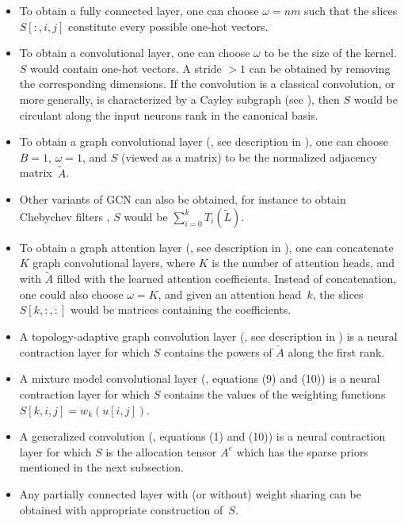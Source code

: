 \begin{itemize}%
\item[\ding{227}] To obtain a fully connected layer, one can choose $\omega = nm$ such that the slices $S[:,i,j]$ constitute every possible one-hot vectors.
\item[\ding{227}] To obtain a convolutional layer, one can choose $\omega$ to be the size of the kernel. $S$ would contain one-hot vectors. A stride $> 1$ can be obtained by removing the corresponding dimensions. If the convolution is a classical convolution, or more generally, is characterized by a Cayley subgraph (see ), then $S$ would be circulant along the input neurons rank in the canonical basis.
\item[\ding{227}] To obtain a graph convolutional layer (\cite{kipf2016semi}, see description in ), one can choose $B = 1$, $\omega = 1$, and $S$ (viewed as a matrix) to be the normalized adjacency matrix~$\widetilde{A}$.
\item[\ding{227}] Other variants of GCN can also be obtained, for instance to obtain Chebychev filters \citep{defferrard2016convolutional}, $S$ would be $\sum_{i=0}^k T_i(\widetilde{L})$.
\item[\ding{227}] To obtain a graph attention layer (\cite{velickovic2017graph}, see description in ), one can concatenate $K$ graph convolutional layers, where $K$ is the number of attention heads, and with $\widetilde{A}$ filled with the learned attention coefficients. Instead of concatenation, one could also choose $\omega=K$, and given an attention head~$k$, the slices $S[k,:,:]$ would be matrices containing the coefficients.
\item[\ding{227}] A topology-adaptive graph convolution layer (\cite{du2017topology}, see description in ) is a neural contraction layer for which $S$ contains the powers of $\widetilde{A}$ along the first rank.
\item[\ding{227}] A mixture model convolutional layer (\cite{monti2016geometric}, equations (9) and (10)) is a neural contraction layer for which $S$ contains the values of the weighting functions \ie $S[k,i,j] = w_k(u[i,j])$.
\item[\ding{227}] A generalized convolution (\cite{vialatte2016generalizing}, equations (1) and (10)) is a neural contraction layer for which $S$ is the allocation tensor $A^e$ which has the sparse priors mentioned in the next subsection.
\item[\ding{227}] Any partially connected layer with (or without) weight sharing can be obtained with appropriate construction of~$S$.
\end{itemize}

